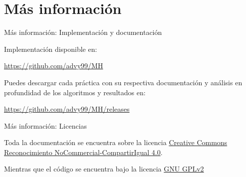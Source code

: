 \documentclass{beamer}
\begin{document}
\section{Más información}
  
\begin{frame}{Más información: Implementación y documentación}

	Implementación disponible en: 
	
	\begin{center}
		\url{https://github.com/advy99/MH}	
	\end{center}
	
	Puedes descargar cada práctica con su respectiva documentación y análisis en profundidad de los algoritmos y resultados en:
	
	\begin{center}
		\url{https://github.com/advy99/MH/releases}	
	\end{center}

	
\end{frame}	  
  
\begin{frame}{Más información: Licencias}
  
	Toda la documentación se encuentra sobre la licencia
 	\href{https://creativecommons.org/licenses/by-nc-sa/4.0/deed.es}{Creative Commons
	Reconocimiento NoCommercial-CompartirIgual 4.0}.

	\begin{center}\ccbyncsa\end{center}

	\vspace{1cm}

	Mientras que el código se encuentra bajo la licencia \href{https://www.gnu.org/licenses/old-licenses/gpl-2.0.html}{GNU GPLv2}
  
\end{frame}
\end{document}
